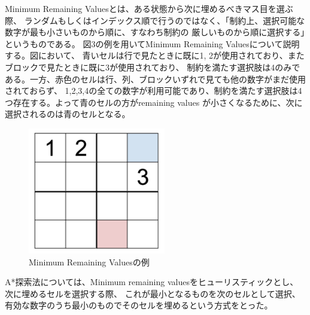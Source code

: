 \documentclass[uplatex]{jsarticle}
\begin{document}
Minimum Remaining Valuesとは、ある状態から次に埋めるべきマス目を選ぶ際、
ランダムもしくはインデックス順で行うのではなく、「制約上、選択可能な数字が最も小さいものから順に、すなわち制約の
厳しいものから順に選択する」というものである。
図3の例を用いてMinimum Remaining Valuesについて説明する。図において、
青いセルは行で見たときに既に1, 2が使用されており、またブロックで見たときに既に3が使用されており、
制約を満たす選択肢は4のみである。一方、赤色のセルは行、列、ブロックいずれで見ても他の数字がまだ使用されておらず、
1,2,3,4の全ての数字が利用可能であり、制約を満たす選択肢は4つ存在する。よって青のセルの方がremaining values
が小さくなるために、次に選択されるのは青のセルとなる。

\begin{figure}
  \begin{center}
    \includegraphics[width=6cm]{img/sudok_minimu.png}
    \caption{Minimum Remaining Valuesの例}
  \end{center}
\end{figure}

A*探索法については、Minimum remaining valuesをヒューリスティックとし、次に埋めるセルを選択する際、
これが最小となるものを次のセルとして選択、有効な数字のうち最小のものでそのセルを埋めるという方式をとった。
\end{document}
